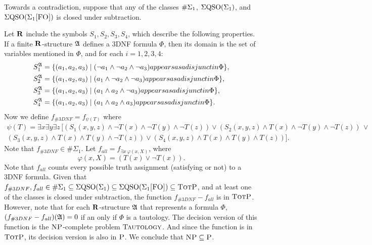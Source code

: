Towards a contradiction, suppose that any of the classes $\#\Sigma_{1}$, $\Sigma{\rm QSO}(\Sigma_{1})$, and $\Sigma{\rm QSO}(\Sigma_{1}\textsc{[FO]})$ is closed under subtraction.

Let $\mathbf{R}$ include the symbols $S_1, S_2, S_3, S_4$, which describe the following properties. If a finite $\mathbf{R}$-structure $\mathfrak{A}$ defines a 3DNF formula $\Phi$, then its domain is the set of variables mentioned in $\Phi$, and for each $i = 1,2,3,4$:
\begin{align*}
	S_1^{\mathfrak{A}} &= \{(a_1,a_2,a_3)\mid (\neg a_1 \wedge \neg a_2 \wedge \neg a_3) \relax{ appears as a disjunct in }\Phi\},\\
	S_2^{\mathfrak{A}} &= \{(a_1,a_2,a_3)\mid ( a_1 \wedge \neg a_2 \wedge \neg a_3) \relax{ appears as a disjunct in }\Phi\},\\
	S_3^{\mathfrak{A}} &= \{(a_1,a_2,a_3)\mid ( a_1 \wedge  a_2 \wedge \neg a_3) \relax{ appears as a disjunct in }\Phi\},\\
	S_4^{\mathfrak{A}} &= \{(a_1,a_2,a_3)\mid ( a_1 \wedge  a_2 \wedge  a_3) \relax{ appears as a disjunct in }\Phi\}.
\end{align*}
Now we define $f_{\#3DNF} = f_{\psi(T)}$ where
\begin{multline*}
\psi(T) = \exists x \exists y \exists z\, [(S_1(x,y,z) \wedge \neg T(x) \wedge \neg T(y) \wedge \neg T(z)) \vee (S_2(x,y,z) \wedge T(x) \wedge \neg T(y) \wedge \neg T(z)) \, \vee \\ (S_3(x,y,z) \wedge T(x) \wedge T(y) \wedge \neg T(z)) \vee (S_4(x,y,z) \wedge T(x) \wedge T(y) \wedge T(z))].
\end{multline*}
Note that $f_{\#3DNF} \in \#\Sigma_1$. Let $f_{all} = f_{\exists x\:\varphi(x,X)}$, where
$$
\varphi(x,X) = (T(x) \vee \neg T(x)).
$$
Note that $f_{all}$ counts every possible truth assignment (satisfying or not) to a 3DNF formula. Given that $f_{\#3DNF}, f_{all} \in \#\Sigma_{1} \subseteq \Sigma{\rm QSO}(\Sigma_{1}) \subseteq \Sigma{\rm QSO}(\Sigma_{1}\textsc{[FO]}) \subseteq \text{\sc TotP}$, and at least one of the classes is closed under subtraction, the function $f_{\#3DNF} - f_{all}$ is in $\text{\sc TotP}$. However, note that for each $\mathbf{R}$-structure $\mathfrak{A}$ that represents a formula $\Phi$, $(f_{\#3DNF} - f_{all})(\mathfrak{A}) = 0$ if an only if $\Phi$ is a tautology. The decision version of this function is the $\text{\sc NP}$-complete problem $\textsc{Tautology}$. And since the function is in $\text{\sc TotP}$, its decision version is also in $\text{\sc P}$. We conclude that $\text{\sc NP} \subseteq \text{\sc P}$.










